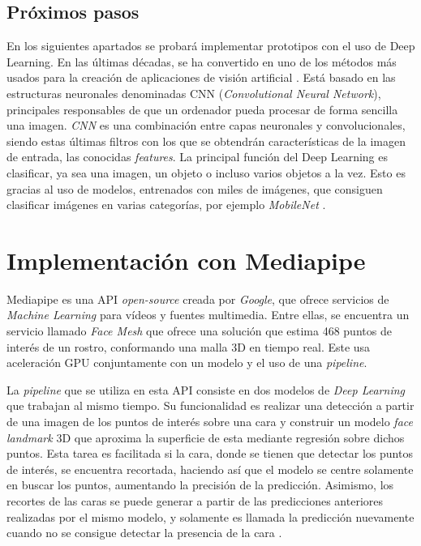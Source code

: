 \vspace{-0.8cm}
\subsection*{Próximos pasos}
\vspace{-0.5cm}
En los siguientes apartados se probará implementar prototipos con el uso de Deep Learning. En las últimas décadas, se ha convertido en uno de los métodos más usados para la creación de aplicaciones de visión artificial \cite{szeliski_2018}. Está basado en las estructuras neuronales denominadas CNN (\textit{Convolutional Neural Network}), principales responsables de que un ordenador pueda procesar de forma sencilla una imagen. \textit{CNN} es una combinación entre capas neuronales y convolucionales, siendo estas últimas filtros con los que se obtendrán características de la imagen de entrada, las conocidas \textit{features}. La principal función del Deep Learning es clasificar, ya sea una imagen, un objeto o incluso varios objetos a la vez. Esto es gracias al uso de modelos, entrenados con miles de imágenes, que consiguen clasificar imágenes en varias categorías, por ejemplo \textit{MobileNet} \cite{cnn}. 

\newpage
\section{Implementación con Mediapipe}
\vspace{-0.7cm}

Mediapipe es una API \textit{open-source} creada por \textit{Google}, que ofrece servicios de \textit{Machine Learning} para vídeos y fuentes multimedia. Entre ellas, se encuentra un servicio llamado \textit{Face Mesh} que ofrece una solución que estima 468 puntos de interés de un rostro, conformando una malla 3D en tiempo real. Este usa aceleración GPU conjuntamente con un modelo y el uso de una \textit{pipeline}.

La \textit{pipeline} que se utiliza en esta API consiste en dos modelos de \textit{Deep Learning} que trabajan al mismo tiempo. Su funcionalidad es realizar una detección a partir de una imagen de los puntos de interés sobre una cara y construir un modelo \textit{face landmark} 3D que aproxima la superficie de esta mediante regresión sobre dichos puntos. Esta tarea es facilitada si la cara, donde se tienen que detectar los puntos de interés, se encuentra recortada, haciendo así que el modelo se centre solamente en buscar los puntos, aumentando la precisión de la predicción. Asimismo, los recortes de las caras se puede generar a partir de las predicciones anteriores realizadas por el mismo modelo, y solamente es llamada la predicción nuevamente cuando no se consigue detectar la presencia de la cara \cite{faceMesh}.

